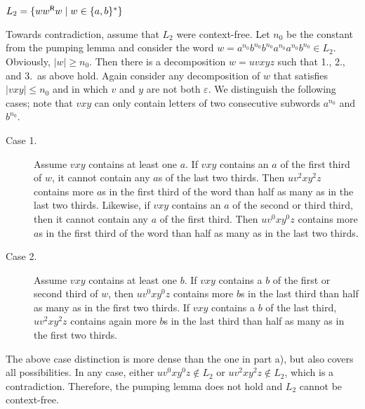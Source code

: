 \documentclass{exercise}
\begin{document}
\subtask $L_2=\{ww^{\textsf{R}}w \mid w\in\{a,b\}^*\}$
  \begin{solution}
    Towards contradiction, assume that $L_2$ were context-free.
    Let $n_0$ be the constant from the pumping lemma and consider the word
    $w = a^{n_0}b^{n_0}b^{n_0}a^{n_0}a^{n_0}b^{n_0} \in L_2$.  Obviously, $|w| \ge n_0$.  Then
    there is a decomposition $w = uvxyz$ such that 1., 2., and 3.\ as above hold.
    Again consider any decomposition of $w$ that satisfies $|vxy| \le n_0$
    and in which $v$ and $y$ are not both $\varepsilon$.  We distinguish the
    following cases; note that $vxy$ can only contain letters of two
    consecutive subwords $a^{n_0}$ and $b^{n_0}$.
    \begin{description}
      \item[Case 1.] Assume $vxy$ contains at least one $a$.  If $vxy$ contains
        an $a$ of the first third of $w$, it cannot contain any $a$s of the
        last two thirds.  Then $uv^2xy^2z$ contains more $a$s in the first
        third of the word than half as many as in the last two thirds.  Likewise,
        if $vxy$ contains an $a$ of the second or third third, then it cannot contain
        any $a$ of the first third.  Then $uv^0xy^0z$ contains more $a$s in the first
        third of the word than half as many as in the last two thirds.
      \item[Case 2.] Assume $vxy$ contains at least one $b$.  If $vxy$ contains
        a $b$ of the first or second third of $w$, then $uv^0xy^0z$ contains more $b$s in
        the last third than half as many as in the first two thirds.  If
        $vxy$ contains a $b$ of the last third, $uv^2xy^2z$ contains again
        more $b$s in the last third than half as many as in the first two thirds.
    \end{description}
    The above case distinction is more dense than the one in part a), but
    also covers all possibilities.  In any case, either $uv^0xy^0z\notin L_2$
    or $uv^2xy^2z\notin L_2$, which is a contradiction.  Therefore,
    the pumping lemma does not hold and $L_2$ cannot be context-free.
  \end{solution}
\end{document}
